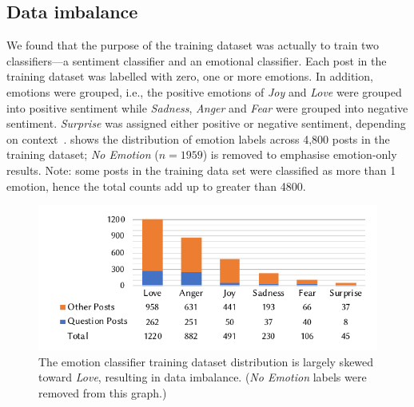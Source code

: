 \subsection{Data imbalance}
 We found that the purpose of the training dataset was actually to train two classifiers---a sentiment classifier and an emotional classifier.  Each post in the training dataset was labelled with zero, one or more emotions. In addition, emotions were grouped, i.e., the positive emotions of \textit{Joy} and \textit{Love} were grouped into positive sentiment while \textit{Sadness}, \textit{Anger} and \textit{Fear} were grouped into negative sentiment. \textit{Surprise} was assigned either positive or negative sentiment, depending on context~\citep{novielli2018, calefato2018}.   shows the distribution of emotion labels across 4,800 posts in the training dataset; \textit{No Emotion} ($n=1959$) is removed to emphasise emotion-only results. Note: some posts in the training data set were classified as more than 1 emotion, hence the total counts add up to greater than 4800.

\begin{figure}
    \centering
    \includegraphics[width=.8\linewidth]{data-imbalance.pdf}
    \caption [Emotion classifier training data imbalance]{The emotion classifier training dataset distribution is largely skewed toward \textit{Love}, resulting in data imbalance. (\textit{No Emotion} labels were removed from this graph.)}
    \label{caise2021:fig:data-imbalance-training}
\end{figure} 

